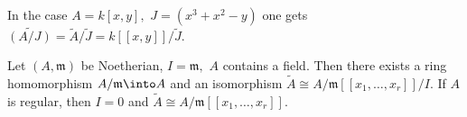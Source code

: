 \begin{example}
  In the case \(A = k[x, y],\) \(J = (x^3 + x^2 - y)\) one gets
  \(\tilde{(A/{J})} = \tilde{A}/{\tilde{J}} = k[[x, y]] /{\tilde{J}}.\)
\end{example}

\begin{theorem}[Cohen]
  Let \((A, \mathfrak{m})\) be Noetherian, \(I = \mathfrak{m},\) \(A\) contains a field. Then there exists a ring homomorphism \(A/{\mathfrak{m}} \into A\) and an isomorphism
  \(\tilde{A} \cong A/{\mathfrak{m}}[[x_1, \dotsc, x_r]]/{I}.\)
  If \(A\) is regular, then \(I = 0\) and \(\tilde{A} \cong A/{\mathfrak{m}}[[x_1, \dotsc, x_r]].\)
\end{theorem}


